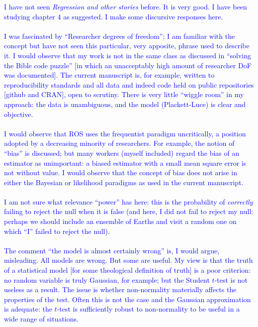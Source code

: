 \documentclass[12pt]{article}
\begin{document}
\textcolor{blue}{I have not seen {\em Regression and other stories}
  before.  It is very good.  I have been studying chapter 4 as
  suggested.  I make some discursive responses here.\\ \\ I was
  fascinated by ``Researcher degrees of freedom''; I am familiar with
  the concept but have not seen this particular, very apposite, phrase
  used to describe it.  I would observe that my work is not in the
  same class as discussed in ``solving the Bible code puzzle'' [in
    which an unacceptably high amount of researcher DoF was
    documented].  The current manuscript is, for example, written to
  reproducibility standards and all data and indeed code held on
  public repositories [github and CRAN], open to scrutiny.  There is
  very little ``wiggle room'' in my approach: the data is unambiguous,
  and the model (Plackett-Luce) is clear and objective.\\ \\ I would
  observe that ROS uses the frequentist paradigm uncritically, a
  position adopted by a decreasing minority of researchers.  For
  example, the notion of ``bias'' is discussed; but many workers
  (myself included) regard the bias of an estimator as unimportant: a
  biased estimator with a small mean square error is not without
  value.  I would observe that the concept of bias does not arise in
  either the Bayesian or likelihood paradigms as used in the current
  manuscript.\\ \\I am not sure what relevance ``power'' has here:
  this is the probability of {\em correctly} failing to reject the
  null when it is false (and here, I did not fail to reject my null:
  perhaps we should include an ensemble of Earths and visit a random
  one on which ``I'' failed to reject the null).\\ \\ The comment
  ``the model is almost certainly wrong'' is, I would argue,
  misleading.  All models are wrong.  But some are useful.  My view is
  that the truth of a statistical model [for some theological
    definition of truth] is a poor criterion: no random variable is
  truly Gaussian, for example; but the Student $t$-test is not useless
  as a result.  The issue is whether non-normality materially affects
  the properties of the test.  Often this is not the case and the
  Gaussian approximation is adequate: the $t$-test is sufficiently
  robust to non-normality to be useful in a wide range of situations.
}
\end{document}

